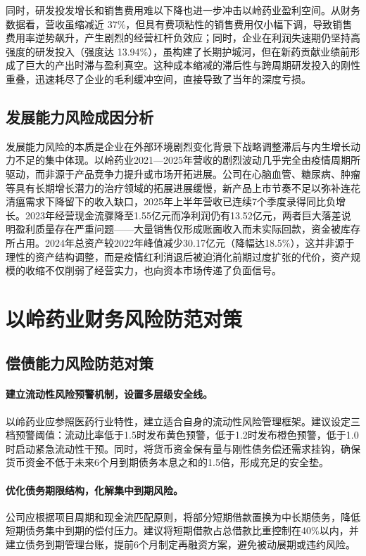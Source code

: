 \documentclass[12pt,a4paper,fontset=windows,UTF8]{ctexart}
\begin{document}
同时，研发投发增长和销售费用难以下降也进一步冲击以岭药业盈利空间。从财务数据看，营收虽缩减近 37\%，但具有费项粘性的销售费用仅小幅下调，导致销售费用率逆势飙升，产生剧烈的经营杠杆负效应；同时，企业在利润失速期仍坚持高强度的研发投入（强度达 13.94\%），虽构建了长期护城河，但在新药贡献业绩前形成了巨大的产出时滞与盈利真空。这种成本缩减的滞后性与跨周期研发投入的刚性重叠，迅速耗尽了企业的毛利缓冲空间，直接导致了当年的深度亏损。

\subsection{发展能力风险成因分析}
发展能力风险的本质是企业在外部环境剧烈变化背景下战略调整滞后与内生增长动力不足的集中体现。以岭药业2021—2025年营收的剧烈波动几乎完全由疫情周期所驱动，而非源于产品竞争力提升或市场开拓进展。公司在心脑血管、糖尿病、肿瘤等具有长期增长潜力的治疗领域的拓展进展缓慢，新产品上市节奏不足以弥补连花清瘟需求下降留下的收入缺口，2025年上半年营收已连续7个季度录得同比负增长。2023年经营现金流骤降至1.55亿元而净利润仍有13.52亿元，两者巨大落差说明盈利质量存在严重问题——大量销售仅形成账面收入而未实际回款，资金被库存所占用。2024年总资产较2022年峰值减少30.17亿元（降幅达18.5\%），这并非源于理性的资产结构调整，而是疫情红利消退后被迫消化前期过度扩张的代价，资产规模的收缩不仅削弱了经营实力，也向资本市场传递了负面信号。

\section{以岭药业财务风险防范对策}
\subsection{偿债能力风险防范对策}
\paragraph*{建立流动性风险预警机制，设置多层级安全线。}
以岭药业应参照医药行业特性，建立适合自身的流动性风险管理框架。建议设定三档预警阈值：流动比率低于1.5时发布黄色预警，低于1.2时发布橙色预警，低于1.0时启动紧急流动性干预。同时，将货币资金保有量与刚性债务偿还需求挂钩，确保货币资金不低于未来6个月到期债务本息之和的1.5倍，形成充足的安全垫。

\paragraph*{优化债务期限结构，化解集中到期风险。}
公司应根据项目周期和现金流匹配原则，将部分短期借款置换为中长期债务，降低短期债务集中到期的偿付压力。建议将短期借款占总借款比重控制在40\%以内，并建立债务到期管理台账，提前6个月制定再融资方案，避免被动展期或违约风险。
\end{document}
